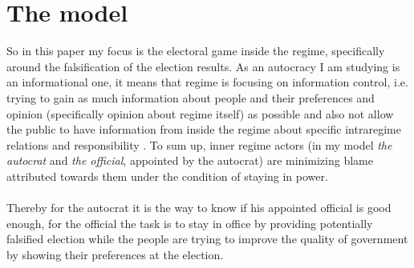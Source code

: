 \documentclass[a4paper, 12pt]{article}
\begin{document}
    \section{The model}
    \noindent So in this paper my focus is the electoral game inside the regime, specifically around the falsification of the election results. As an autocracy I am studying is an informational one, it means that regime is focusing on information control, i.e. trying to gain as much information about people and their preferences and opinion (specifically opinion about regime itself) as possible and also not allow the public to have information from inside the regime about specific intraregime relations and responsibility \parencite{inform2}. To sum up, inner regime actors (in my model \textit{the autocrat} and \textit{the official}, appointed by the autocrat) are minimizing blame attributed towards them under the condition of staying in power.\\\\
    \noindent Thereby for the autocrat it is the way to know if his appointed official is good enough, for the official the task is to stay in office by providing potentially falsified election while the people are trying to improve the quality of government by showing their preferences at the election.
    
\end{document}
